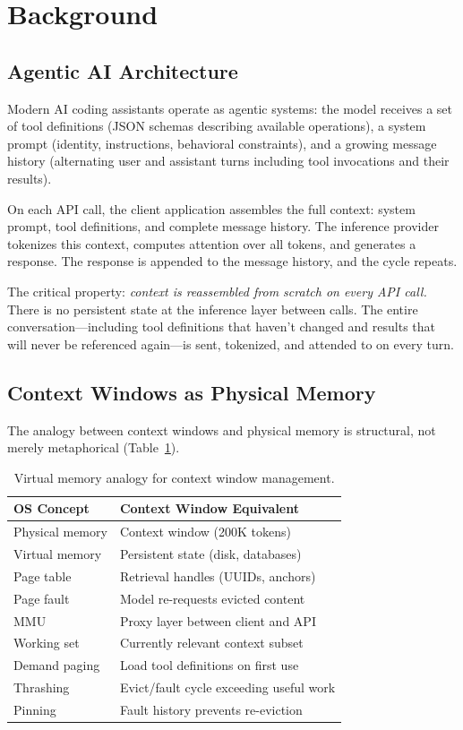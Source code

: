 \section{Background}
\label{sec:background}

\subsection{Agentic AI Architecture}

Modern AI coding assistants operate as agentic systems: the model
receives a set of tool definitions (JSON schemas describing available
operations), a system prompt (identity, instructions, behavioral
constraints), and a growing message history (alternating user and
assistant turns including tool invocations and their results).

On each API call, the client application assembles the full context:
system prompt, tool definitions, and complete message history. The
inference provider tokenizes this context, computes attention over
all tokens, and generates a response. The response is appended to
the message history, and the cycle repeats.

The critical property: \emph{context is reassembled from scratch on
every API call.} There is no persistent state at the inference layer
between calls. The entire conversation---including tool definitions
that haven't changed and results that will never be referenced
again---is sent, tokenized, and attended to on every turn.

\subsection{Context Windows as Physical Memory}

The analogy between context windows and physical memory is structural,
not merely metaphorical (Table~\ref{tab:vm-analogy}).

\begin{table}[ht]
\centering
\caption{Virtual memory analogy for context window management.}
\label{tab:vm-analogy}
\small
\begin{tabular}{@{}ll@{}}
\toprule
\textbf{OS Concept} & \textbf{Context Window Equivalent} \\
\midrule
Physical memory & Context window (200K tokens) \\
Virtual memory & Persistent state (disk, databases) \\
Page table & Retrieval handles (UUIDs, anchors) \\
Page fault & Model re-requests evicted content \\
MMU & Proxy layer between client and API \\
Working set & Currently relevant context subset \\
Demand paging & Load tool definitions on first use \\
Thrashing & Evict/fault cycle exceeding useful work \\
Pinning & Fault history prevents re-eviction \\
\bottomrule
\end{tabular}
\end{table}

